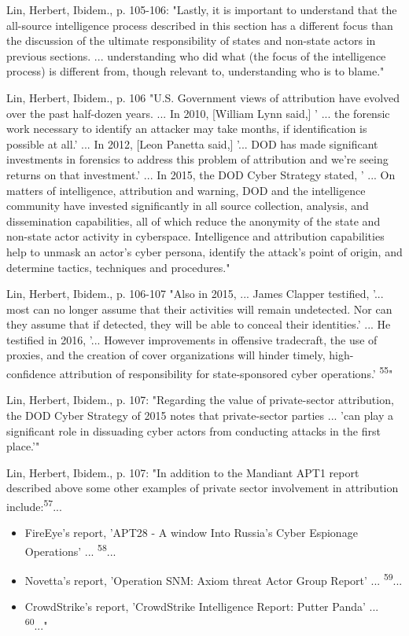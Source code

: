Lin, Herbert, Ibidem., p. 105-106: "Lastly, it is important to understand that the all-source intelligence process described in this section has a different focus than the discussion of the ultimate responsibility of states and non-state actors in previous sections. ... understanding who did what (the focus of the intelligence process) is different from, though relevant to, understanding who is to blame."

Lin, Herbert, Ibidem., p. 106 "U.S. Government views of attribution have evolved over the past half-dozen years. ... In 2010, [William Lynn said,] ' ... the forensic work necessary to identify an attacker may take months, if identification is possible at all.' ... In 2012, [Leon Panetta said,] '... DOD has made significant investments in \gls{forensics} to address this problem of attribution and we're seeing returns on that investment.' ... In 2015, the DOD Cyber Strategy stated, ' ... On matters of intelligence, attribution and warning, DOD and the intelligence community have invested significantly in all source collection, analysis, and dissemination capabilities, all of which reduce the anonymity of the state and non-state actor activity in cyberspace. Intelligence and attribution capabilities help to unmask an actor's cyber persona, identify the \gls{attack}'s point of origin, and determine tactics, techniques and procedures."

Lin, Herbert, Ibidem., p. 106-107 "Also in 2015, ... James Clapper testified, '... most can no longer assume that their activities will remain undetected. Nor can they assume that if detected, they will be able to conceal their identities.' ... He testified in 2016, '... However improvements in offensive tradecraft, the use of proxies, and the creation of cover organizations will hinder timely, high-confidence attribution of responsibility for state-sponsored cyber operations.' \textsuperscript{55}"

Lin, Herbert, Ibidem., p. 107: "Regarding the value of private-sector attribution, the DOD Cyber Strategy of 2015 notes that private-sector parties ... 'can play a significant role in dissuading cyber actors from conducting attacks in the first place.'"

Lin, Herbert, Ibidem., p. 107: "In addition to the Mandiant APT1 report described above some other examples of private sector involvement in attribution include:\textsuperscript{57}... \begin{itemize} \item FireEye's report, 'APT28 - A window Into Russia's Cyber Espionage Operations' ... \textsuperscript{58}... \item Novetta's report, 'Operation SNM: Axiom \gls{threat} Actor Group Report' ... \textsuperscript{59}... \item CrowdStrike's report, 'CrowdStrike Intelligence Report: Putter Panda' ... \textsuperscript{60}..." \end{itemize}

